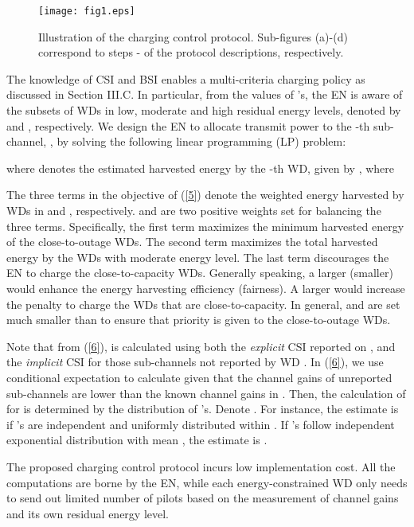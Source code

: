 \documentclass[conference]{IEEEtran}
\begin{document}
\begin{figure}
\centering
  \begin{center}
    \texttt{[image: fig1.eps]}
  \end{center}
  \caption{Illustration of the charging control protocol. Sub-figures (a)-(d) correspond to steps - of the protocol descriptions, respectively. }
  \label{11}
\end{figure}

The knowledge of CSI and BSI enables a multi-criteria charging policy as discussed in Section III.C. In particular, from the values of 's, the EN is aware of the subsets of WDs in low, moderate and high residual energy levels, denoted by  and , respectively. We design the EN to allocate transmit power  to the -th sub-channel, , by solving the following linear programming (LP) problem:

where  denotes the estimated harvested energy by the -th WD, given by , where

The three terms in the objective of (\ref{5}) denote the weighted energy harvested by WDs in  and , respectively.  and  are two positive weights set for balancing the three terms. Specifically, the first term maximizes the minimum harvested energy of the close-to-outage WDs. The second term maximizes the total harvested energy by the WDs with moderate energy level. The last term discourages the EN to charge the close-to-capacity WDs. Generally speaking, a larger (smaller)  would enhance the energy harvesting efficiency (fairness). A larger  would increase the penalty to charge the WDs that are close-to-capacity. In general,  and  are set much smaller than  to ensure that priority is given to the close-to-outage WDs.

Note that from (\ref{6}),  is calculated using both the \emph{explicit} CSI reported on , and the \emph{implicit} CSI for those sub-channels not reported by WD . In (\ref{6}), we use conditional expectation to calculate  given that the channel gains of unreported sub-channels are lower than the known channel gains in . Then, the calculation of  for  is determined by the distribution of 's. Denote . For instance, the estimate is  if 's are independent and uniformly distributed within . If 's follow independent exponential distribution with mean , the estimate is .

The proposed charging control protocol incurs low implementation cost. All the computations are borne by the EN, while each energy-constrained WD only needs to send out limited number of pilots based on the measurement of channel gains and its own residual energy level.
\end{document}
